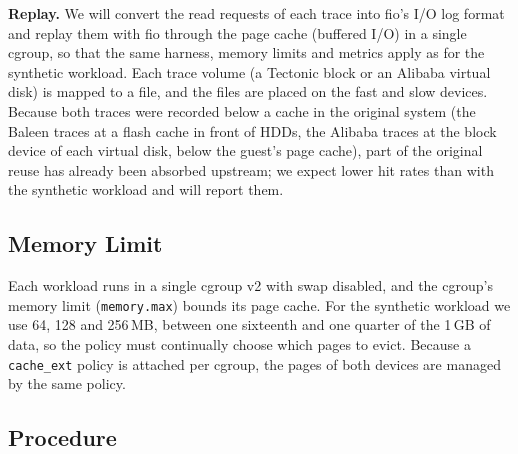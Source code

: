 \documentclass[11pt,sigconf,nonacm]{acmart}
\newcommand{\cacheExt}{\texttt{cache\_ext}}
\begin{document}
\textbf{Replay.} We will convert the read requests of each trace into fio's I/O log format and replay them with fio through the page cache (buffered I/O) in a single cgroup, so that the same harness, memory limits and metrics apply as for the synthetic workload. Each trace volume (a Tectonic block or an Alibaba virtual disk) is mapped to a file, and the files are placed on the fast and slow devices.  Because both traces were recorded below a cache in the original system (the Baleen traces at a flash cache in front of HDDs, the Alibaba traces at the block device of each virtual disk, below the guest's page cache), part of the original reuse has already been absorbed upstream; we expect lower hit rates than with the synthetic workload and will report them.

\subsection{Memory Limit}

Each workload runs in a single cgroup v2 with swap disabled, and the cgroup's memory limit (\texttt{memory.max}) bounds its page cache. For the synthetic workload we use 64, 128 and 256\,MB, between one sixteenth and one quarter of the 1\,GB of data, so the policy must continually choose which pages to evict.  Because a \cacheExt{} policy is attached per cgroup, the pages of both devices are managed by the same policy.

\subsection{Procedure}
\end{document}
